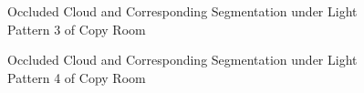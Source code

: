 \documentclass[11pt, a4paper,oneside,chapterprefix=false]{scrbook}
\begin{document}
\begin{figure}[H]
    \centering
      \label{fig:copy 5 occluded} \hfill
     \label{fig:copy 5 seg}
    \caption{Occluded Cloud and Corresponding Segmentation under Light Pattern 3 of Copy Room}
    \label{fig:copy 5 occ and seg}
\end{figure}

\begin{figure}[H]
    \centering
      \label{fig:copy 6 occluded} \hfill
     \label{fig:copy 6 seg}
    \caption{Occluded Cloud and Corresponding Segmentation under Light Pattern 4 of Copy Room}
    \label{fig:copy 6 occ and seg}
\end{figure}
\end{document}
